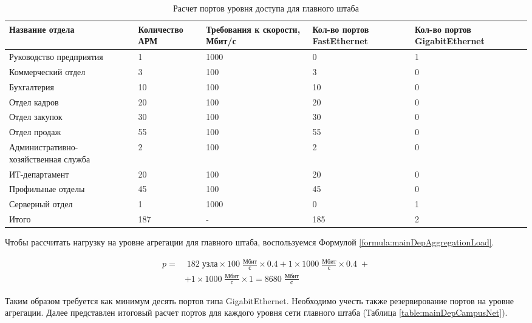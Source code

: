 \documentclass[14pt, a4paper]{extarticle}
\numberwithin{equation}{section}
\begin{document}
\begin{table}[H]
\centering
\small
\caption{Расчет портов уровня доступа для главного штаба}
\label{table:mainDepAccessLevel}
\begin{tabular}{|m{4cm}|m{2.5cm}|m{2.5cm}|m{2.5cm}|m{3cm}|}
\hline
\textbf{Название отдела} & \textbf{Количество АРМ} & \textbf{Требования к скорости, Мбит/с} & \textbf{Кол-во портов FastEthernet} & \textbf{Кол-во портов GigabitEthernet} \\
\hline
Руководство предприятия & 1 & 1000 & 0 & 1 \\
\hline
Коммерческий отдел & 3 & 100 & 3 & 0 \\
\hline
Бухгалтерия & 10 & 100 & 10 & 0 \\
\hline
Отдел кадров & 20 & 100 & 20 & 0 \\
\hline
Отдел закупок & 30 & 100 & 30 & 0 \\
\hline
Отдел продаж & 55 & 100 & 55 & 0 \\
\hline
Административно-хозяйственная служба & 2 & 100 & 2 & 0 \\
\hline
ИТ-департамент & 20 & 100 & 20 & 0 \\
\hline
Профильные отделы & 45 & 100 & 45 & 0 \\
\hline
Серверный отдел & 1 & 1000 & 0 & 1 \\
\hline
Итого & 187 & - & 185 & 2 \\
\hline 
\end{tabular}
\end{table}

Чтобы рассчитать нагрузку на уровне агрегации для 
главного штаба, воспользуемся Формулой \ref{formula:mainDepAggregationLoad}.

\begin{equation}
\begin{aligned}
p = & \; 182 \; \text{узла} \times 100 \;\frac{\text{Мбит}}{\text{с}} \times 0.4 + 1 \times 1000 \;\frac{\text{Мбит}}{\text{с}} \times 0.4\; + \\
        & + 1 \times 1000\;\frac{\text{Мбит}}{\text{с}} \times 1 = 8680\;\frac{\text{Мбит}}{\text{с}}
\end{aligned}
\label{formula:mainDepAggregationLoad}
\end{equation}
               
Таким образом требуется как минимум десять портов типа GigabitEthernet.
Необходимо учесть также резервирование портов на уровне агрегации.
Далее представлен итоговый расчет портов для каждого уровня сети
главного штаба (Таблица \ref{table:mainDepCampusNet}). 
\end{document}
